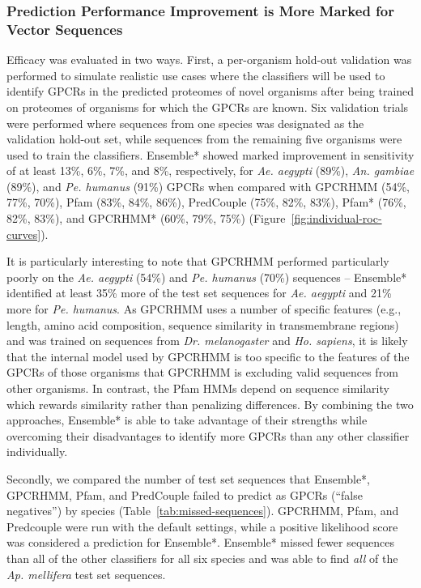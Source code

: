 \subsubsection{Prediction Performance Improvement is More Marked for Vector Sequences}

Efficacy was evaluated in two ways.  First, a per-organism hold-out validation was performed to simulate realistic use cases where the classifiers will be used to identify GPCRs in the predicted proteomes of novel organisms after being trained on proteomes of organisms for which the GPCRs are known.  Six validation trials were performed where sequences from one species was designated as the validation hold-out set, while sequences from the remaining five organisms were used to train the classifiers. Ensemble* showed marked improvement in sensitivity of at least 13\%, 6\%, 7\%, and 8\%, respectively, for \emph{Ae. aegypti} (89\%), \emph{An. gambiae} (89\%), and \emph{Pe. humanus} (91\%) GPCRs when compared with GPCRHMM (54\%, 77\%, 70\%), Pfam (83\%, 84\%, 86\%), PredCouple (75\%, 82\%, 83\%), Pfam* (76\%, 82\%, 83\%), and GPCRHMM* (60\%, 79\%, 75\%) (Figure~\ref{fig:individual-roc-curves}).

 It is particularly interesting to note that GPCRHMM performed particularly poorly on the \emph{Ae. aegypti} (54\%) and \emph{Pe. humanus} (70\%) sequences -- Ensemble* identified at least 35\% more of the test set sequences for \emph{Ae. aegypti} and 21\% more for \emph{Pe. humanus}. As GPCRHMM uses a number of specific features (e.g., length, amino acid composition, sequence similarity in transmembrane regions) and was trained on sequences from \emph{Dr. melanogaster} and \emph{Ho. sapiens}, it is likely that the internal model used by GPCRHMM is too specific to the features of the GPCRs of those organisms that GPCRHMM is excluding valid sequences from other organisms.  In contrast, the Pfam HMMs depend on sequence similarity which rewards similarity rather than penalizing differences.  By combining the two approaches, Ensemble* is able to take advantage of their strengths while overcoming their disadvantages to identify more GPCRs than any other classifier individually.

Secondly, we compared the number of test set sequences that Ensemble*, GPCRHMM, Pfam, and PredCouple failed to predict as GPCRs (``false negatives'') by species (Table~\ref{tab:missed-sequences}). GPCRHMM, Pfam, and Predcouple were run with the default settings, while a positive likelihood score was considered a prediction for Ensemble*. Ensemble* missed fewer sequences than all of the other classifiers for all six species and  was able to find \emph{all} of the \emph{Ap. mellifera} test set sequences.


